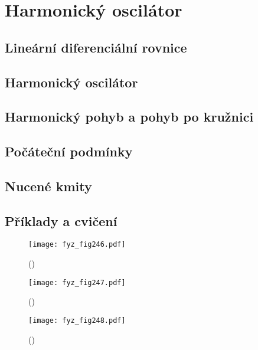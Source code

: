 {
\chapter{Harmonický oscilátor}\label{fyz:IchapXXI}
\minitoc
  \section{Lineární diferenciální rovnice}\label{fyz:IchapXXIsecI}
  \section{Harmonický oscilátor}\label{fyz:IchapXXIsecII}
  \section{Harmonický pohyb a pohyb po kružnici}\label{fyz:IchapXXIsecIII}
  \section{Počáteční podmínky}\label{fyz:IchapXXIsecIV}
  \section{Nucené kmity}\label{fyz:IchapXXIsecV}
  \section{Příklady a cvičení}\label{fyz:IchapXXIsecVI}

    \begin{figure}[ht!] %
      \centering
      \texttt{[image: fyz\_fig246.pdf]}
      \caption{
               (\cite[s.~10000]{Feynman01})}
      \label{fyz_fig246}
    \end{figure}

    \begin{figure}[ht!] %
      \centering
      \texttt{[image: fyz\_fig247.pdf]}
      \caption{
               (\cite[s.~10000]{Feynman01})}
      \label{fyz_fig247}
    \end{figure}

    \begin{figure}[ht!] %
      \centering
      \texttt{[image: fyz\_fig248.pdf]}
      \caption{
               (\cite[s.~10000]{Feynman01})}
      \label{fyz_fig248}
    \end{figure}
 
} %
\printbibliography[title={Seznam literatury}, heading=subbibliography]
